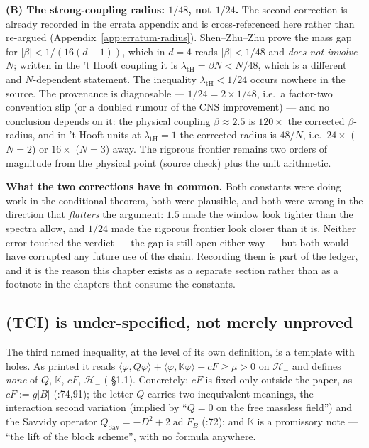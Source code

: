\textbf{(B) The strong-coupling radius: $1/48$, not $1/24$.} The second correction is already
recorded in the errata appendix and is cross-referenced here rather than re-argued
(Appendix~\ref{app:erratum-radius}). Shen--Zhu--Zhu prove the mass gap for
$\lvert\beta\rvert<1/(16(d-1))$, which in $d=4$ reads $\lvert\beta\rvert<1/48$ and \emph{does not
involve $N$}; written in the 't Hooft coupling it is $\lambda_{\mathrm{tH}}=\beta N<N/48$, which is
a different and $N$-dependent statement. The inequality $\lambda_{\mathrm{tH}}<1/24$ occurs nowhere
in the source. The provenance is diagnosable --- $1/24=2\times1/48$, i.e.\ a factor-two convention
slip (or a doubled rumour of the CNS improvement) --- and no conclusion depends on it: the physical
coupling $\beta\approx2.5$ is $120\times$ the corrected $\beta$-radius, and in 't Hooft units at
$\lambda_{\mathrm{tH}}=1$ the corrected radius is $48/N$, i.e.\ $24\times$ ($N=2$) or $16\times$
($N=3$) away. The rigorous frontier remains two orders of magnitude from the physical point
\LT{} (source check) plus the unit arithmetic.

\textbf{What the two corrections have in common.} Both constants were doing work in the conditional
theorem, both were plausible, and both were wrong in the direction that \emph{flatters} the
argument: $1.5$ made the window look tighter than the spectra allow, and $1/24$ made the rigorous
frontier look closer than it is. Neither error touched the verdict --- the gap is still open either
way --- but both would have corrupted any future use of the chain. Recording them is part of the
ledger, and it is the reason this chapter exists as a separate section rather than as a footnote in
the chapters that consume the constants.

\subsection{(TCI) is under-specified, not merely unproved}

The third named inequality, at the level of its own definition, is a template with holes. As printed
it reads $\langle\varphi,Q\varphi\rangle+\langle\varphi,\mathbb K\varphi\rangle-cF\ge\mu>0$ on
$\mathcal H_-$ and defines \emph{none} of $Q$, $\mathbb K$, $cF$, $\mathcal H_-$
( \S1.1). Concretely: $cF$ is fixed only outside the paper, as
$cF:=g\lvert B\rvert$ (:74,91); the letter $Q$ carries two inequivalent
meanings, the interaction second variation (implied by ``$Q=0$ on the free massless field'') and the
Savvidy operator $Q_{\mathrm{Sav}}=-D^2+2\operatorname{ad}F_B$ (:72); and
$\mathbb K$ is a promissory note --- ``the lift of the block scheme'', with no formula anywhere.

